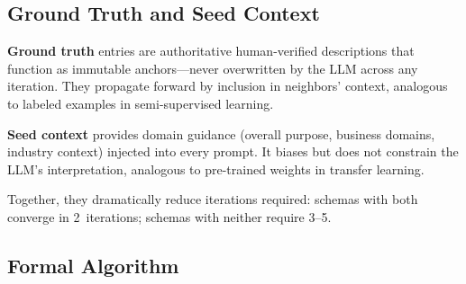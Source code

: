 \documentclass[twocolumn]{svjour3}
\begin{document}
\subsection{Ground Truth and Seed Context}

\textbf{Ground truth} entries are authoritative human-verified descriptions that function as immutable anchors---never overwritten by the LLM across any iteration. They propagate forward by inclusion in neighbors' context, analogous to labeled examples in semi-supervised learning.

\textbf{Seed context} provides domain guidance (overall purpose, business domains, industry context) injected into every prompt. It biases but does not constrain the LLM's interpretation, analogous to pre-trained weights in transfer learning.

Together, they dramatically reduce iterations required: schemas with both converge in 2~iterations; schemas with neither require 3--5.

\subsection{Formal Algorithm}
\end{document}
